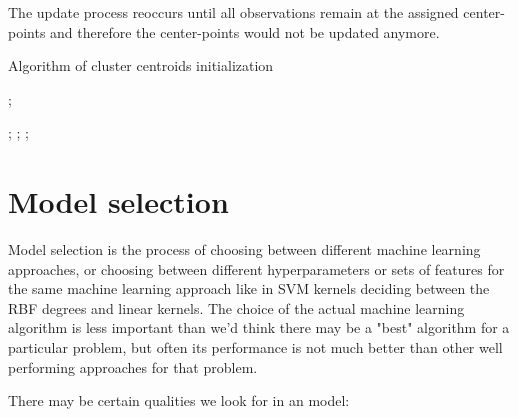 The update process reoccurs until all observations remain at the assigned center-points and therefore the center-points would not be updated anymore.

\begin{algorithm}
\caption{Algorithm of cluster centroids initialization}

\begin{algorithmic}[1]

\Function{}{}

;

;
;
;
\EndFor

\EndFunction
\end{algorithmic}
\end{algorithm}


\section{Model selection } \label{ms}
Model selection is the process of choosing between different machine learning approaches,  or choosing between different hyperparameters or sets of features for the same machine learning approach  like in SVM kernels deciding between the RBF degrees and linear kernels.
The choice of the actual machine learning algorithm is less important than we'd think  there may be a "best" algorithm for a particular problem, but often its performance is not much better than other well performing approaches for that problem.


There may be certain qualities we look for in an model:

